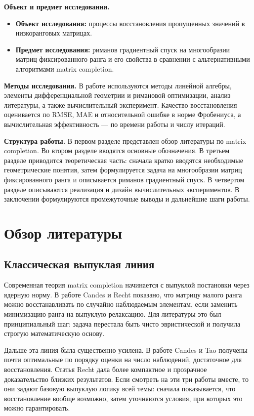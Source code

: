 \documentclass[a4paper,12pt]{article}
\begin{document}
\textbf{Объект и предмет исследования.}
\begin{itemize}
    \item \textbf{Объект исследования:} процессы восстановления пропущенных значений в низкоранговых матрицах.
    \item \textbf{Предмет исследования:} риманов градиентный спуск на многообразии матриц фиксированного ранга и его свойства в сравнении с альтернативными алгоритмами matrix completion.
\end{itemize}

\textbf{Методы исследования.} В работе используются методы линейной алгебры, элементы дифференциальной геометрии и римановой оптимизации, анализ литературы, а также вычислительный эксперимент. Качество восстановления оценивается по RMSE, MAE и относительной ошибке в норме Фробениуса, а вычислительная эффективность --- по времени работы и числу итераций.

\textbf{Структура работы.} В первом разделе представлен обзор литературы по matrix completion. Во втором разделе вводятся основные обозначения. В третьем разделе приводится теоретическая часть: сначала кратко вводятся необходимые геометрические понятия, затем формулируется задача на многообразии матриц фиксированного ранга и описывается риманов градиентный спуск. В четвертом разделе описываются реализация и дизайн вычислительных экспериментов. В заключении формулируются промежуточные выводы и дальнейшие шаги работы.

\newpage

\section{Обзор литературы}
\label{sec:literature}

\subsection{Классическая выпуклая линия}

Современная теория matrix completion начинается с выпуклой постановки через ядерную норму. В работе Candes и Recht \cite{candes-recht} показано, что матрицу малого ранга можно восстанавливать по случайно наблюдаемым элементам, если заменить минимизацию ранга на выпуклую релаксацию. Для литературы это был принципиальный шаг: задача перестала быть чисто эвристической и получила строгую математическую основу.

Дальше эта линия была существенно усилена. В работе Candes и Tao \cite{candes-tao} получены почти оптимальные по порядку оценки на число наблюдений, достаточное для восстановления. Статья Recht \cite{recht} дала более компактное и прозрачное доказательство близких результатов. Если смотреть на эти три работы вместе, то они задают базовую выпуклую логику всей темы: сначала показывается, что восстановление вообще возможно, затем уточняются условия, при которых это можно гарантировать.
\end{document}
